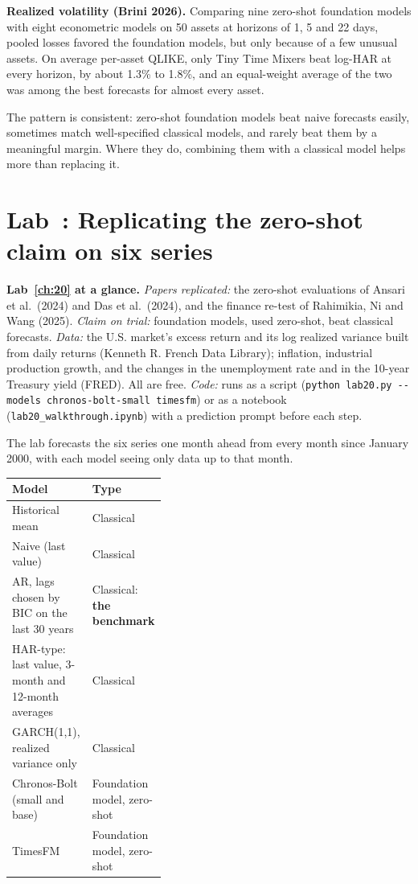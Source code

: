 \textbf{Realized volatility (Brini 2026).} Comparing nine zero-shot foundation models with eight econometric models on 50 assets at horizons of 1, 5 and 22 days, pooled losses favored the foundation models, but only because of a few unusual assets. On average per-asset QLIKE, only Tiny Time Mixers beat log-HAR at every horizon, by about 1.3\% to 1.8\%, and an equal-weight average of the two was among the best forecasts for almost every asset.

The pattern is consistent: zero-shot foundation models beat naive forecasts easily, sometimes match well-specified classical models, and rarely beat them by a meaningful margin. Where they do, combining them with a classical model helps more than replacing it.

\section{Lab~\thechapter: Replicating the zero-shot claim on six series}
\label{sec:21-lab}

\begin{callout}
\textbf{Lab~\ref{ch:20} at a glance.} \emph{Papers replicated:} the zero-shot evaluations of Ansari et al.\ (2024) and Das et al.\ (2024), and the finance re-test of Rahimikia, Ni and Wang (2025). \emph{Claim on trial:} foundation models, used zero-shot, beat classical forecasts. \emph{Data:} the U.S. market's excess return and its log realized variance built from daily returns (Kenneth R. French Data Library); inflation, industrial production growth, and the changes in the unemployment rate and in the 10-year Treasury yield (FRED). All are free. \emph{Code:} runs as a script (\texttt{python lab20.py -{}-models chronos-bolt-small timesfm}) or as a notebook (\texttt{lab20\_walkthrough.ipynb}) with a prediction prompt before each step.
\end{callout}

The lab forecasts the six series one month ahead from every month since January 2000, with each model seeing only data up to that month.

\begin{center}
\small
\begin{tabularx}{0.9\linewidth}{@{}>{\raggedright\arraybackslash}X>{\raggedright\arraybackslash}p{0.38\linewidth}@{}}
\toprule
Model & Type \\
\midrule
Historical mean & Classical \\
Naive (last value) & Classical \\
AR, lags chosen by BIC on the last 30 years & Classical: \textbf{the benchmark} \\
HAR-type: last value, 3-month and 12-month averages & Classical \\
GARCH(1,1), realized variance only & Classical \\
Chronos-Bolt (small and base) & Foundation model, zero-shot \\
TimesFM & Foundation model, zero-shot \\
\bottomrule
\end{tabularx}
\end{center}

